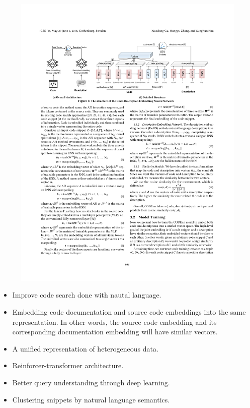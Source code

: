 \documentclass[11pt,a4paper]{article}
\begin{document}
\begin{paracol}{2}
{}
\vspace{1em}




\begin{figure}[H]
\begin{center}
    \includegraphics[width=\linewidth]{Gu2018-image.pdf}
\end{center}
\end{figure}

\begin{itemize}
            \item Improve code search done with nautal language.
    \end{itemize}

\begin{itemize}
            \item Embedding code documentation and source code
embeddings into the same representation. In other words, the source code
embedding and its corresponding documentation embedding will have
similar vectors.
            \item A unified representation of heterogeneous data.
            \item Reinforcer-transformer architecture.
            \item Better query understanding through deep learning.
            \item Clustering snippets by natural language semantics.
    \end{itemize}


\end{paracol}
\end{document}
